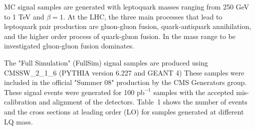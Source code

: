
MC signal samples are generated with leptoquark masses ranging from 250 GeV to 1 TeV and $\beta=1$. 
At the LHC, the three main processes that lead to leptoquark pair production are gluon-gluon fusion, 
quark-antiquark annihilation, and the higher order process of quark-gluon fusion. In the mass range to be investigated gluon-gluon fusion dominates. 

The "Full Simulation" (FullSim) signal samples are produced using 
CMSSW\_2\_1\_6 (PYTHIA version 6.227 and GEANT 4) 
These samples were included in the official "Summer 08" production by the CMS Generators group.
These signal events were generated for 100 $\mbox{pb}^{-1}$ samples with the accepted mis-calibration and alignment 
of the detectors. Table~1
shows the number of events and the cross sections at leading order (LO) for samples generated at different LQ mass.

